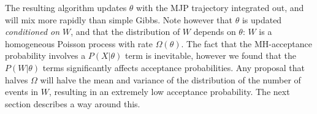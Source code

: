 The resulting algorithm updates $\theta$ with the MJP trajectory integrated out, 
and will mix more rapidly than simple Gibbs. 
Note however that $\theta$ is updated {\em conditioned on
$W$}, and that
the distribution of $W$ depends on $\theta$: 
$W$ is a homogeneous
Poisson process with rate $\Omega(\theta)$. %
The fact that the MH-acceptance probability involves a $P(X|\theta)$ term
is inevitable, however we found that the $P(W|\theta)$
terms significantly affects acceptance probabilities. 
Any proposal that halves $\Omega$ will halve the
mean and variance of the distribution of the number of events in $W$, 
resulting in an extremely low acceptance probability.
The next section describes a way around this.
\vspace{-.1in}
